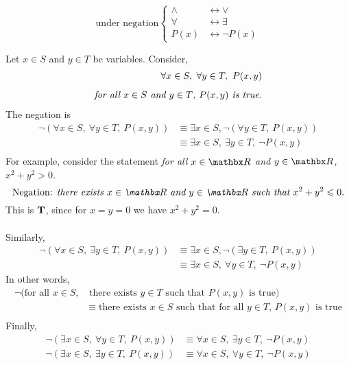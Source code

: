 
\begin{discussion}
\begin{equation*}
\text{under negation}\left\{\begin{aligned}
	\wedge &\leftrightarrow \vee\\[0.5em]
	\forall &\leftrightarrow \exists\\[0.5em]
	P(x) &\leftrightarrow \neg P(x)
\end{aligned}\right.
\end{equation*}
\end{discussion}

\vspace*{1em}

\begin{discussion}
Let $x \in S$ and $y \in T$ be variables. Consider,
\begin{align*}
\forall x \in S,\ \forall y \in T,\ P(x,y)\\[0.5em]
\text{\emph{for all $x \in S$ and $y \in T$, $P(x,y)$ is true.}}
\end{align*}
The negation is
\begin{align*}
\neg(\forall x \in S,\ \forall y \in T,\ P(x,y)) &\equiv \exists x \in S,\neg(\forall y \in T,\ P(x,y))\\[0.5em]
&\equiv \exists x \in S,\ \exists y \in T,\ \neg P(x,y)\\
\end{align*}
For example, consider the statement \emph{for all $x \in \rr$ and $y \in \rr$, $x^2 + y^2 > 0$.}
\[\text{Negation: \emph{there exists $x \in \rr$ and $y \in \rr$ such that $x^2 + y^2 \leq 0$}.}\]
This is $\mathbf{T}$, since for $x = y = 0$ we have $x^2 + y^2 = 0$.\\
\\
Similarly,
\begin{align*}
\neg(\forall x \in S,\ \exists y \in T,\ P(x,y)) &\equiv \exists x \in S,\neg(\exists y \in T,\ P(x,y))\\[0.5em]
&\equiv \exists x \in S,\ \forall y \in T,\ \neg P(x,y)
\end{align*}
In other words,
\begin{align*}
\neg(\text{for all $x \in S$,} &\text{ there exists $y \in T$ such that $P(x,y)$ is true})\\[0.5em]
&\equiv \text{there exists $x \in S$ such that for all $y \in T$, $P(x,y)$ is true}\\
\end{align*}
Finally,
\begin{align*}
\neg(\exists x \in S,\ \forall y \in T,\ P(x,y)) &\equiv \forall x \in S,\ \exists y \in T,\ \neg P(x,y)\\[0.5em]
\neg(\exists x \in S,\ \exists y \in T,\ P(x,y)) &\equiv \forall x \in S,\ \forall y \in T,\ \neg P(x,y)
\end{align*}
\end{discussion}

